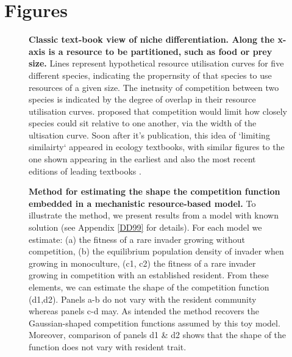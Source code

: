 \documentclass[a4paper,11pt]{article}
\begin{document}
\section{Figures}

\begin{figure}[h]
  \centering
  \caption{\textbf{Classic text-book view of niche differentiation.
  Along the x-axis is a resource to be partitioned, such as food or prey size.} Lines
  represent hypothetical resource utilisation curves for five different species,
  indicating the propernsity of that species to use resources of a given size.
  The inetnsity of competition between two species is indicated by the degree
  of overlap in their resource utilisation curves. \citet{MacArthur-1967} proposed
  that competition would limit how closely species could sit relative to one
  another, via the width of the ultisation curve. Soon after it's publication,
  this idea of `limiting similairty` appeared in ecology textbooks, with similar
  figures to the one shown appearing in the earliest and also the most recent
  editions of leading textbooks \citep{begon-1986, begon-2006, Krebs-1978, Krebs-2013,
  Ricklefs-1973, Ricklefs-1999}.}
  \label{fig:competition-kernels}
\end{figure}

\begin{figure}[h]
 \centering
 \caption{\textbf{Method for estimating the shape the competition function embedded
  in a mechanistic resource-based model.} To illustrate the method, we present
  results from a model with known solution \citep{Dieckmann-1999} (see Appendix
  \ref{DD99} for details). For each
  model we estimate: (a) the fitness of a rare invader growing without competition,
  (b) the equilibrium population density of invader when growing in monoculture,
  (c1, c2) the fitness of a rare invader growing in competition with an established
  resident. From these elements, we can estimate the shape of the competition
  function (d1,d2). Panels a-b do not vary with the resident community whereas
  panels c-d may.  As intended the method recovers the Gaussian-shaped competition
  functions assumed by this toy model. Moreover, comparison of panels d1 \& d2
  shows that the shape of the function does not vary with resident trait.
  \label{fig:components}}
\end{figure}
\end{document}

